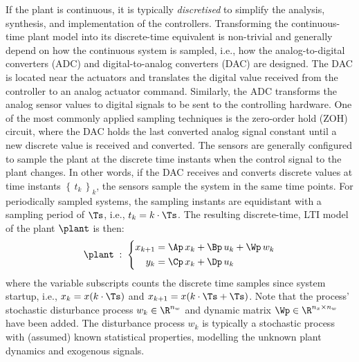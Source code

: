 If the plant is continuous, it is typically \emph{discretised} to simplify the analysis, synthesis, and implementation of the controllers.
Transforming the continuous-time plant model into its discrete-time equivalent is non-trivial and generally depend on how the continuous system is sampled, i.e., how the analog-to-digital converters (ADC) and digital-to-analog converters (DAC) are designed.
The DAC is located near the actuators and translates the digital value received from the controller to an analog actuator command.
Similarly, the ADC transforms the analog sensor values to digital signals to be sent to the controlling hardware.
One of the most commonly applied sampling techniques is the zero-order hold (ZOH) circuit, where the DAC holds the last converted analog signal constant until a new discrete value is received and converted.
The sensors are generally configured to sample the plant at the discrete time instants when the control signal to the plant changes.
In other words, if the DAC receives and converts discrete values at time instants $\left\{\, t_k \,\right\}_k$, the sensors sample the system in the same time points.
For periodically sampled systems, the sampling instants are equidistant with a sampling period of $\Ts$, i.e., $t_k = k\cdot \Ts$.
The resulting discrete-time, LTI model of the plant $\plant$ is then:
%
\begin{equation}%
    \label{eq:discrete-lti-plant}%
    \plant \; : \; \left\{\begin{aligned}
        x_{k+1} &= \Ap\,x_k + \Bp\,u_k + \Wp\, w_k\\
        y_k &= \Cp\,x_k + \Dp\,u_k \\
    \end{aligned}\right.
\end{equation}
%
where the variable subscripts counts the discrete time samples since system startup, i.e., $x_k = x(k\cdot \Ts)$ and $x_{k+1} = x(k\cdot \Ts + \Ts)$.
Note that the process' stochastic disturbance process $w_k \in \R^{n_w}$ and dynamic matrix $\Wp \in \R^{n_x \times n_w}$ have been added.
The disturbance process $w_k$ is typically a stochastic process with (assumed) known statistical properties, modelling the unknown plant dynamics and exogenous signals.

